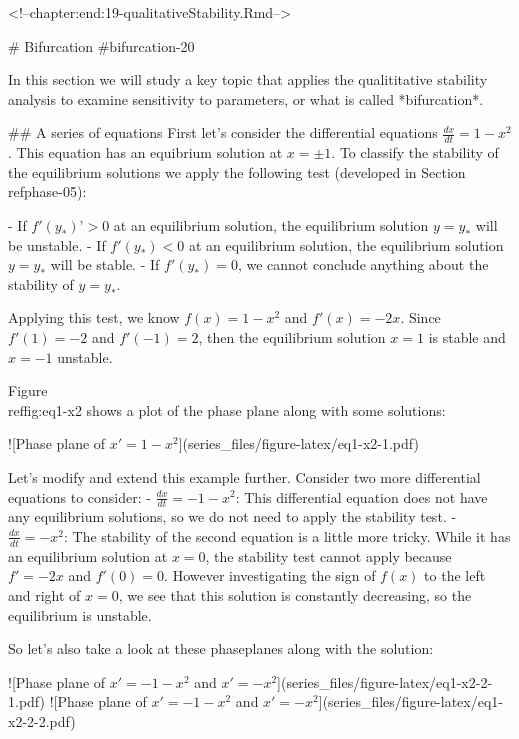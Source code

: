 \documentclass[
]{book}
\theoremstyle{definition}
\theoremstyle{definition}
\theoremstyle{definition}
\theoremstyle{remark}
\begin{document}
<!--chapter:end:19-qualitativeStability.Rmd-->

# Bifurcation {#bifurcation-20}

In this section we will study a key topic that applies the qualititative stability analysis to examine sensitivity to parameters, or what is called *bifurcation*.

## A series of equations
First let's consider the differential equations $\displaystyle \frac{dx}{dt} = 1-x^{2}$. This equation has an equibrium solution at $x=\pm 1$.  To classify the stability of the equilibrium solutions we apply the following test (developed in Section \\ref{phase-05}):


- If $f'(y_{*})’>0$ at an equilibrium solution, the equilibrium solution $y=y_{*}$ will be unstable.
- If $f'(y_{*}) <0$ at an equilibrium solution, the equilibrium solution $y=y_{*}$ will be stable.
- If $f'(y_{*}) = 0$, we cannot conclude anything about the stability of $y=y_{*}$.

Applying this test, we know $f(x)=1-x^2$ and $f'(x)=-2x$.  Since $f'(1)=-2$ and $f'(-1)=2$, then the equilibrium solution $x=1$ is stable and $x=-1$ unstable.

Figure \\ref{fig:eq1-x2} shows a plot of the phase plane along with some solutions:

![\label{fig:eq1-x2}Phase plane of $x'=1-x^{2}$](series_files/figure-latex/eq1-x2-1.pdf) 


Let's modify and extend this example further. Consider two more differential equations to consider:
 - $\displaystyle \frac{dx}{dt} = -1-x^{2}$: This differential equation does not have any equilibrium solutions, so we do not need to apply the stability test.
 - $\displaystyle \frac{dx}{dt} = -x^{2}$:  The stability of the second equation is a little more tricky.  While it has an equilibrium solution at $x=0$, the stability test cannot apply because $f'=-2x$ and $f'(0)=0$.  However investigating the sign of $f(x)$ to the left and right of $x=0$, we see that this solution is constantly decreasing, so the equilibrium is unstable.

So let's also take a look at these phaseplanes along with the solution:

![\label{fig:eq1-x2-2-1}Phase plane of $x'=-1-x^{2}$ and $x'=-x^{2}$](series_files/figure-latex/eq1-x2-2-1.pdf) ![\label{fig:eq1-x2-2-2}Phase plane of $x'=-1-x^{2}$ and $x'=-x^{2}$](series_files/figure-latex/eq1-x2-2-2.pdf) 
\end{document}
